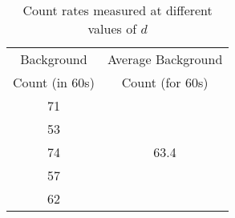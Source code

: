 \begin{table}[H]
    \centering
    \begin{tabular}{|c|c|}\hline
        \multicolumn{1}{|c|}{Background} & \multicolumn{1}{c|}{Average Background} \\ 
        \multicolumn{1}{|c|}{Count (in 60s)} & \multicolumn{1}{c|}{Count (for 60s)} \\ \hline
        \multicolumn{1}{|c|}{71} & \multicolumn{1}{c|}{\multirow{5}{*}{63.4}} \\
        \multicolumn{1}{|c|}{53} & \multicolumn{1}{c|}{} \\
        \multicolumn{1}{|c|}{74} & \multicolumn{1}{c|}{} \\
        \multicolumn{1}{|c|}{57} & \multicolumn{1}{c|}{} \\
        \multicolumn{1}{|c|}{62} & \multicolumn{1}{c|}{} \\\hline
    \end{tabular}
    \caption{Count rates measured at different values of $d$}
    \label{t4}
\end{table}